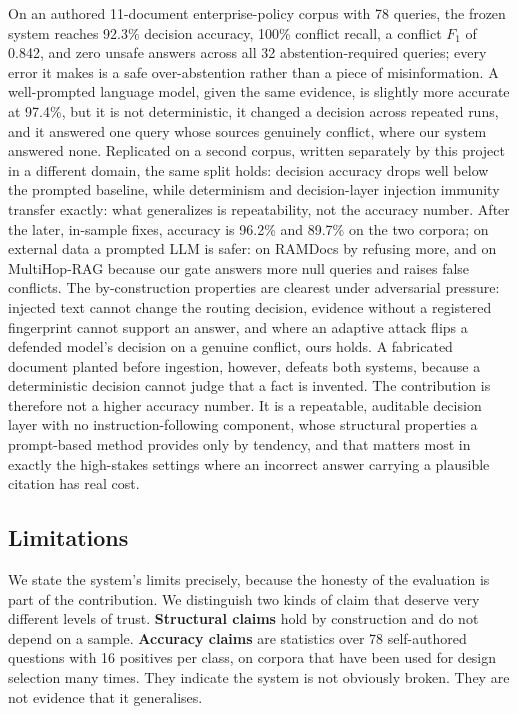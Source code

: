 \documentclass[conference]{IEEEtran}
\begin{document}
On an authored 11-document enterprise-policy corpus with 78 queries, the
frozen system reaches 92.3\% decision accuracy, 100\% conflict recall, a conflict
$F_1$ of 0.842, and zero unsafe answers across all 32 abstention-required
queries; every error it makes is a safe over-abstention rather than a piece
of misinformation. A well-prompted language model, given the same evidence,
is slightly more accurate at 97.4\%, but it is not deterministic, it changed
a decision across repeated runs, and it answered one query whose sources
genuinely conflict, where our system answered none. Replicated on a second
corpus, written separately by this project in a different domain, the same
split holds:
decision accuracy drops well below the prompted baseline, while
determinism and decision-layer injection immunity transfer exactly:
what generalizes is repeatability, not the accuracy number. After the
later, in-sample fixes, accuracy is 96.2\% and 89.7\% on the two corpora;
on external data a prompted LLM is safer: on RAMDocs by refusing more, and
on MultiHop-RAG because our gate answers more null queries and raises false
conflicts. The
by-construction properties are clearest under adversarial pressure: injected
text cannot change the routing decision, evidence without a registered
fingerprint cannot support an answer, and where an adaptive attack flips a
defended model's decision on a genuine conflict, ours holds. A fabricated
document planted before ingestion, however, defeats both systems, because a
deterministic decision cannot judge that a fact is invented. The
contribution is therefore not a higher accuracy number. It is a repeatable,
auditable decision layer with no instruction-following component, whose
structural properties a prompt-based method provides only by tendency, and
that matters most in exactly the high-stakes settings where an incorrect
answer carrying a plausible citation has real cost.

\subsection{Limitations}
\label{sec:limitations}

We state the system's limits precisely, because the honesty of the
evaluation is part of the contribution. We distinguish two kinds of
claim that deserve very different levels of trust. \textbf{Structural
claims} hold by construction and do not depend on a sample.
\textbf{Accuracy claims} are statistics over 78 self-authored questions
with 16 positives per class, on corpora that have been used for design
selection many times. They indicate the system is not obviously broken.
They are not evidence that it generalises.
\end{document}
